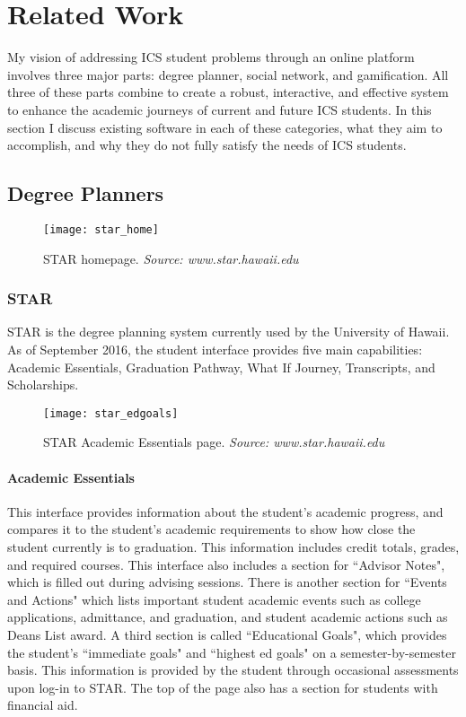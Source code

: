 \chapter{Related Work}
My vision of addressing ICS student problems through an online platform involves three major parts: degree planner, social network, and gamification. All three of these parts combine to create a robust, interactive, and effective system to enhance the academic journeys of current and future ICS students. In this section I discuss existing software in each of these categories, what they aim to accomplish, and why they do not fully satisfy the needs of ICS students.

\section{Degree Planners}
\begin{figure}[h]
\centering
\texttt{[image: star\_home]}
\caption{STAR homepage. \textit{Source: www.star.hawaii.edu}}
\end{figure}
\subsection{STAR}
STAR is the degree planning system currently used by the University of Hawaii. As of September 2016, the student interface provides five main capabilities: Academic Essentials, Graduation Pathway, What If Journey, Transcripts, and Scholarships. 

\begin{figure}[h]
\centering
\texttt{[image: star\_edgoals]}
\caption{STAR Academic Essentials page. \textit{Source: www.star.hawaii.edu}}
\end{figure}
\subsubsection{Academic Essentials}
This interface provides information about the student's academic progress, and compares it to the student's academic requirements to show how close the student currently is to graduation. This information includes credit totals, grades, and required courses. This interface also includes a section for ``Advisor Notes", which is filled out during advising sessions. There is another section for ``Events and Actions" which lists important student academic events such as college applications, admittance, and graduation, and student academic actions such as Deans List award. A third section is called ``Educational Goals", which provides the student's ``immediate goals" and ``highest ed goals" on a semester-by-semester basis. This information is provided by the student through occasional assessments upon log-in to STAR. The top of the page also has a section for students with financial aid.

